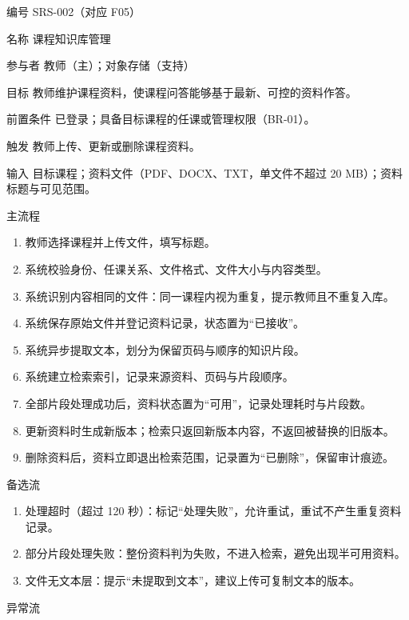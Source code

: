 \documentclass[12pt,a4paper]{ctexart}
\newenvironment{reqcard}
  {\begin{description}[leftmargin=6.2em,style=nextline,itemsep=4pt]}
  {\end{description}}
\begin{document}
\begin{reqcard}
  \item[编号] SRS-002（对应 F05）
  \item[名称] 课程知识库管理
  \item[参与者] 教师（主）；对象存储（支持）
  \item[目标] 教师维护课程资料，使课程问答能够基于最新、可控的资料作答。
  \item[前置条件] 已登录；具备目标课程的任课或管理权限（BR-01）。
  \item[触发] 教师上传、更新或删除课程资料。
  \item[输入] 目标课程；资料文件（PDF、DOCX、TXT，单文件不超过 20 MB）；资料标题与可见范围。
  \item[主流程]
    \begin{enumerate}[label=M\arabic*,leftmargin=2.6em]
      \item 教师选择课程并上传文件，填写标题。
      \item 系统校验身份、任课关系、文件格式、文件大小与内容类型。
      \item 系统识别内容相同的文件：同一课程内视为重复，提示教师且不重复入库。
      \item 系统保存原始文件并登记资料记录，状态置为“已接收”。
      \item 系统异步提取文本，划分为保留页码与顺序的知识片段。
      \item 系统建立检索索引，记录来源资料、页码与片段顺序。
      \item 全部片段处理成功后，资料状态置为“可用”，记录处理耗时与片段数。
      \item 更新资料时生成新版本；检索只返回新版本内容，不返回被替换的旧版本。
      \item 删除资料后，资料立即退出检索范围，记录置为“已删除”，保留审计痕迹。
    \end{enumerate}
  \item[备选流]
    \begin{enumerate}[label=A\arabic*,leftmargin=2.6em]
      \item 处理超时（超过 120 秒）：标记“处理失败”，允许重试，重试不产生重复资料记录。
      \item 部分片段处理失败：整份资料判为失败，不进入检索，避免出现半可用资料。
      \item 文件无文本层：提示“未提取到文本”，建议上传可复制文本的版本。
    \end{enumerate}
  \item[异常流]
    \begin{enumerate}[label=E\arabic*,leftmargin=2.6em]

\end{enumerate}
\end{reqcard}
\end{document}
